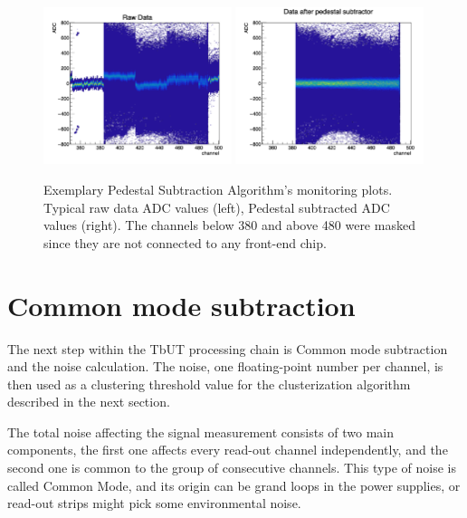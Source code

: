 \begin{figure}[tbph]
\begin{center}
\includegraphics[width = 0.49\textwidth]{figures/raw_data.png} 
\includegraphics[width = 0.49\textwidth]{figures/pedestal_data.png}
\caption{Exemplary Pedestal Subtraction Algorithm's monitoring plots. Typical raw data ADC values (left), Pedestal subtracted ADC values
(right). The channels below 380 and above 480 were masked since they are not connected to any front-end chip.} 
\label{fig:raw vs ped}
 \end{center}
\end{figure}


\section{Common mode subtraction}
The next step within the TbUT processing chain is Common mode subtraction and the noise calculation. The noise, one floating-point number per channel,  is then used as a clustering threshold value for the clusterization algorithm described in the next section. 


The total noise affecting the signal measurement consists of two main components,  the first one affects every read-out channel independently, and the second one is common to the group of consecutive channels.  This type of noise is called Common Mode, and its origin can be grand loops in the power supplies, or read-out strips might pick some environmental noise. 

